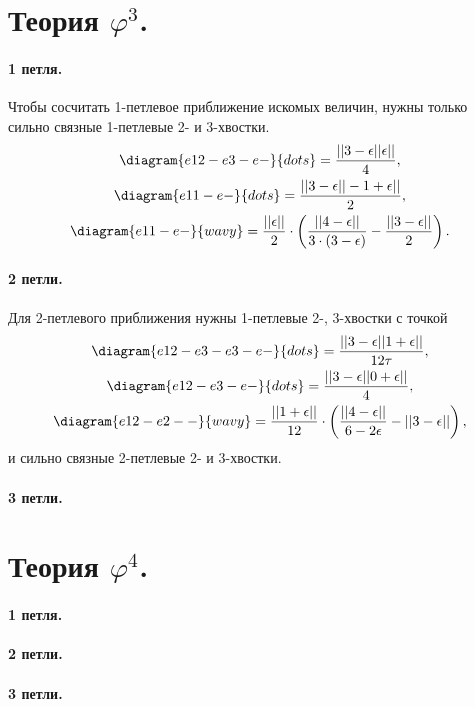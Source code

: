 \documentclass[10pt,a4paper]{article}
\begin{document}
\section{Теория $\varphi^3$.}
%
\paragraph{1 петля.} Чтобы сосчитать 1-петлевое приближение искомых величин, нужны только сильно связные 1-петлевые 2- и 3-хвостки.
\begin{gather}
\diagram{e12-e3-e-}{dots} = \frac{||3 - \epsilon||\epsilon||}{4},\\
\diagram{e11-e-}{dots} = \frac{||3 - \epsilon||-1 + \epsilon||}{2},\\
\diagram{e11-e-}{wavy} = \frac{||\epsilon||}{2} \cdot \left(\frac{||4 - \epsilon||}{3\cdot(3 -\epsilon)} - \frac{||3 - \epsilon||}{2} \right) .
\end{gather}
%
\paragraph{2 петли.} Для 2-петлевого приближения нужны 1-петлевые 2-, 3-хвостки с точкой
\begin{gather}
\diagram{e12-e3-e3-e-}{dots} = \frac{||3 - \epsilon||1 + \epsilon||}{12\tau}, \\
\diagram{e12-e3-e-}{dots} = \frac{||3 - \epsilon||0 + \epsilon||}{4},\\
\diagram{e12-e2--}{wavy} = \frac{||1+\epsilon||}{12}\cdot \left( \frac{||4-\epsilon||}{6-2\epsilon} - ||3-\epsilon|| \right), 
\end{gather}
и сильно связные 2-петлевые 2- и 3-хвостки.
\paragraph{3 петли.}
\section{Теория $\varphi^4$.}
\paragraph{1 петля.}
\paragraph{2 петли.}
\paragraph{3 петли.}
\end{document}
